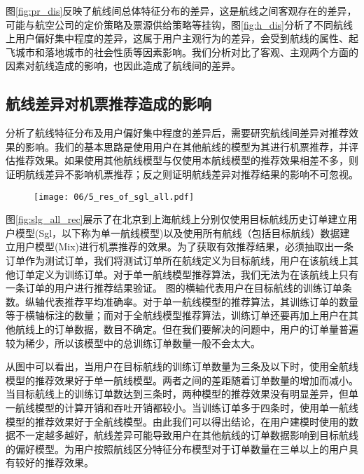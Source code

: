 图\ref{fig:pr_dis}反映了航线间总体特征分布的差异，这是航线之间客观存在的差异，可能与航空公司的定价策略及票源供给策略等挂钩，图\ref{fig:h_dis}分析了不同航线上用户偏好集中程度的差异，这属于用户主观行为的差异，会受到航线的属性、起飞城市和落地城市的社会性质等因素影响。我们分析对比了客观、主观两个方面的因素对航线造成的影响，也因此造成了航线间的差异。

\subsection{航线差异对机票推荐造成的影响}

分析了航线特征分布及用户偏好集中程度的差异后，需要研究航线间差异对推荐效果的影响。我们的基本思路是使用用户在其他航线的模型为其进行机票推荐，并评估推荐效果。如果使用其他航线模型与仅使用本航线模型的推荐效果相差不多，则证明航线差异不影响机票推荐；反之则证明航线差异对推荐结果的影响不可忽视。

\begin{figure}
 \centering
 \texttt{[image: 06/5\_res\_of\_sgl\_all.pdf]}
\end{figure}

图\ref{fig:slg_all_rec}展示了在北京到上海航线上分别仅使用目标航线历史订单建立用户模型(Sgl，以下称为单一航线模型)以及使用所有航线（包括目标航线）数据建立用户模型(Mix)进行机票推荐的效果。为了获取有效推荐结果，必须抽取出一条订单作为测试订单，我们将测试订单所在航线定义为目标航线，用户在该航线上其他订单定义为训练订单。对于单一航线模型推荐算法，我们无法为在该航线上只有一条订单的用户进行推荐结果验证。
图的横轴代表用户在目标航线的训练订单条数。纵轴代表推荐平均准确率。对于单一航线模型的推荐算法，其训练订单的数量等于横轴标注的数量；而对于全航线模型推荐算法，训练订单还要再加上用户在其他航线上的订单数据，数目不确定。但在我们要解决的问题中，用户的订单量普遍较为稀少，所以该模型中的总训练订单数量一般不会太大。

从图中可以看出，当用户在目标航线的训练订单数量为三条及以下时，使用全航线模型的推荐效果好于单一航线模型。两者之间的差距随着订单数量的增加而减小。当目标航线上的训练订单数达到三条时，两种模型的推荐效果没有明显差异，但单一航线模型的计算开销和吞吐开销都较小。当训练订单多于四条时，使用单一航线模型的推荐效果好于全航线模型。由此我们可以得出结论，在用户建模时使用的数据不一定越多越好，航线差异可能导致用户在其他航线的订单数据影响到目标航线的偏好模型。为用户按照航线区分特征分布模型对于订单数量在三单以上的用户具有较好的推荐效果。

